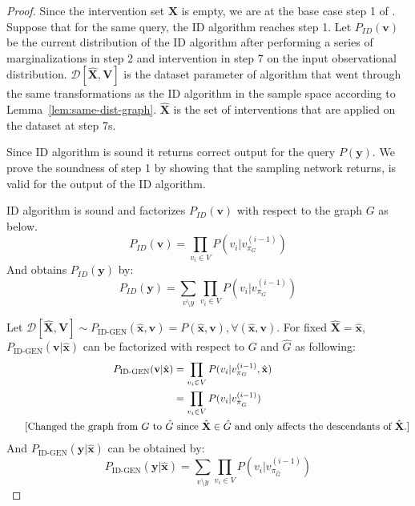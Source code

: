 \documentclass{article}
\newcommand{\red}{\textcolor{red}}
\newcommand{\y}{\mathbf{y}}
\newcommand{\X}{\mathbf{X}}
\newcommand{\Xp}{{\hat{\mathbf{X}}}}
\newcommand{\xp}{{\hat{\mathbf{x}}}}
\newcommand{\Gp}{{\hat{{G}}}}
\newcommand{\Y}{\mathbf{Y}}
\newcommand{\V}{\mathbf{V}}
\newcommand{\vb}{\mathbf{v}}
\newcommand{\data}{\mathcal{D}}
\newcommand{\idgen}{\text{ID-GEN}\xspace}
\theoremstyle{plain}
\theoremstyle{definition}
\theoremstyle{remark}
\begin{document}
	\begin{proof}
  Since the intervention set $\X$ is empty, we are at the base case step 1 of \idgen.
%
  Suppose that for the same query, the ID algorithm reaches step 1.
  Let $P_{ID}(\vb)$ be the current distribution of the ID algorithm after performing a series of marginalizations in step 2 and intervention in step 7 on the input observational distribution.
		$\data[\Xp, \V]$ is the dataset parameter of \idgen algorithm that went through the same transformations as the ID algorithm in the sample space according to Lemma~\ref{lem:same-dist-graph}.
		$\Xp$ is the set of interventions that are applied on the dataset at step 7s.
		
		Since ID algorithm is sound it returns correct output for the query $P(\y)$. We prove the soundness of \idgen step 1 by showing that the sampling network \idgen returns, is valid for the output of the ID algorithm.
		
		
		ID algorithm is sound and factorizes $P_{ID}(\vb)$ with respect to the graph $G$
		as below.
		\begin{equation*}
			P_{ID}(\vb) = 
			\prod_{v_i\in V} P(v_i|  v_{\pi_{G}}^{(i-1)})
		\end{equation*}
		And obtains $ P_{ID}(\y)$ by:
		\begin{equation}
			\label{eq:step1-id-factor}
			 P_{ID}(\y) = 
			\sum_{v\setminus y}
			\prod_{v_i\in V} P(v_i|  v_{\pi_{G}}^{(i-1)})
		\end{equation}
		
		
		Let $\data[\Xp, \V] \sim P_{\idgen}(\xp, \vb) = P(\xp, \vb), \forall (\xp, \vb)$.
%
  For fixed $\Xp= \xp$,
		$P_{\idgen}(\vb|\xp)$ can be factorized with respect to $G$ and $\Gp$ as following:
		\begin{equation*}
			\begin{split}
				P_{\idgen}(\vb|\xp) &= \prod_{v_i\in V} P(v_i| v_{\pi_{G}}^{(i-1)}, \xp)\\
				&= \prod_{v_i\in V} P(v_i| v_{\pi_{\Gp}}^{(i-1)}) \\
				\text{\hspace{5mm} [Changed the graph from $G$ to $\Gp$} & \text{ since $\Xp \in \Gp$ and only affects the descendants of $\Xp$.]}
			\end{split}
		\end{equation*}
		And $P_{\idgen}(\y|\xp)$ can be obtained by:
		\begin{equation}
			\label{eq:step1-iddag-factor}
			P_{\idgen}(\y|\xp) = 
			\sum_{v\setminus y} \prod_{v_i\in V} P(v_i|  v_{\pi_{\Gp}}^{(i-1)})
		\end{equation}
		

\end{proof}
\end{document}
